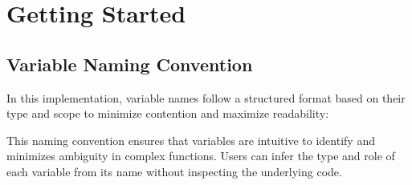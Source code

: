 \newpage
\section{Getting Started}
\label{Getting Started}

\subsection{Variable Naming Convention}
\label{Variable Naming Convention}
\begin{NexMainBox}
	\begin{NexMainBox}
		In this implementation, variable names follow a structured format based on their type and scope to minimize contention and maximize readability:
	\end{NexMainBox}
	\begin{NexMainBox}
		\begin{NexListDark}
		\end{NexListDark}
	\end{NexMainBox}
	\begin{NexMainBox}
		This naming convention ensures that variables are intuitive to identify and minimizes ambiguity in complex functions. Users can infer the type and role of each variable from its name without inspecting the underlying code.
	\end{NexMainBox}
\end{NexMainBox}

